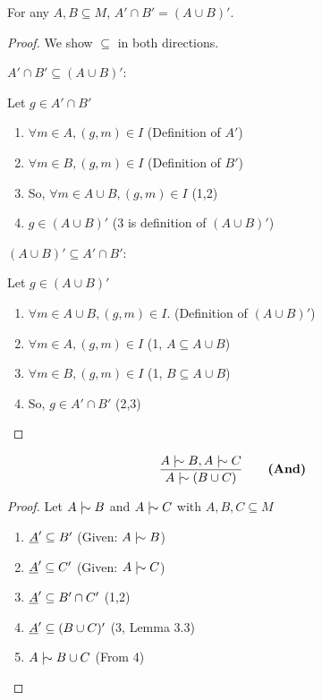 \documentclass[11pt]{article}
\begin{document}
\begin{lemma}
  For any $A, B \subseteq M$, $A' \cap B' = (A \cup B)'$.
\end{lemma}

\begin{proof}
  We show $\subseteq$ in both directions.

  $A' \cap B' \subseteq (A \cup B)'$:

  Let $g \in A' \cap B'$
  \begin{enumerate}
    \item $\forall m \in A, (g,m) \in I$ \hfill (Definition of $A'$)
    \item $\forall m \in B, (g,m) \in I$ \hfill (Definition of $B'$)
    \item So, $\forall m \in A \cup B, (g,m) \in I$ \hfill (1,2)
    \item $g \in (A \cup B)'$ \hfill (3 is definition of $(A \cup B)'$)\\
  \end{enumerate}

  $(A \cup B)' \subseteq A' \cap B'$:

  Let $g \in (A \cup B)'$
  \begin{enumerate}
    \item $\forall m \in A \cup B, (g,m) \in I$. \hfill (Definition of $(A \cup B)'$)
    \item $\forall m \in A, (g,m) \in I$ \hfill (1, $A \subseteq A \cup B$)
    \item $\forall m \in B, (g,m) \in I$ \hfill (1, $B \subseteq A \cup B$)
    \item So, $g \in A' \cap B'$ \hfill(2,3)
  \end{enumerate}
\end{proof}

\begin{equation}
  \frac{A \twiddle B, A \twiddle C}{A \twiddle (B \cup C)} \qquad \textbf{(And)}
\end{equation}

\begin{proof}
  Let $A \twiddle B$ and $A \twiddle C$ with $A, B, C \subseteq M$
  \begin{enumerate}
    \item $\underline{A}' \subseteq B'$ \hfill (Given: $A \twiddle B$)
    \item $\underline{A}' \subseteq C'$ \hfill (Given: $A \twiddle C$)
    \item $\underline{A}' \subseteq B' \cap C'$ \hfill (1,2)
    \item $\underline{A}' \subseteq (B\cup C)'$ \hfill (3, Lemma 3.3)
    \item $A \twiddle B \cup C$ \hfill (From 4)
  \end{enumerate}
\end{proof}
\end{document}

